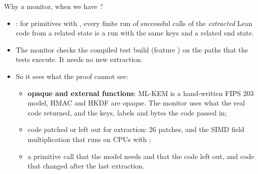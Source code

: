 \begin{frame}[t]{Why a monitor, when we have ?}
  \footnotesize
  \begin{itemize}\footnotesize
    \item {}: for primitives with , every finite run of
      successful calls of the \emph{extracted} Lean code from a related state is a
       run with the same keys and a related end state.
    \item The monitor checks the compiled test build (feature ) on the paths
      that the tests execute. It needs no new extraction.
    \item So it sees what the proof cannot see:
      \begin{itemize}\footnotesize
        \item \textbf{opaque and external functions}: ML-KEM is a hand-written FIPS 203 model,
          HMAC and HKDF are opaque. The monitor uses what the real code returned, and the keys,
          labels and bytes the code passed in;
        \item code patched or left out for extraction: 26 patches, and the SIMD field
          multiplication that runs on CPUs with ;
        \item a primitive call that the model needs and that the code left out, and code that
          changed after the last extraction.
      \end{itemize}
  \end{itemize}
  \centering
\end{frame}

